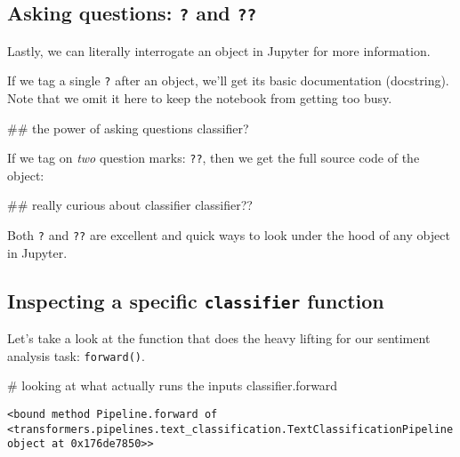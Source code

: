 \documentclass[
  letterpaper,
  DIV=11,
  numbers=noendperiod]{scrartcl}
\newenvironment{Shaded}{\begin{snugshade}}{\end{snugshade}}
\newcommand{\CommentTok}[1]{\textcolor[rgb]{0.37,0.37,0.37}{#1}}
\newcommand{\NormalTok}[1]{\textcolor[rgb]{0.00,0.23,0.31}{#1}}
\begin{document}
\subsection{\texorpdfstring{Asking questions: \texttt{?} and
\texttt{??}}{Asking questions: ? and ??}}\label{asking-questions-and}

Lastly, we can literally interrogate an object in Jupyter for more
information.

If we tag a single \texttt{?} after an object, we'll get its basic
documentation (docstring). Note that we omit it here to keep the
notebook from getting too busy.

\begin{Shaded}
\begin{Highlighting}[]
\CommentTok{\#\# the power of asking questions}
\NormalTok{classifier?}
\end{Highlighting}
\end{Shaded}

If we tag on \emph{two} question marks: \texttt{??}, then we get the
full source code of the object:

\begin{Shaded}
\begin{Highlighting}[]
\CommentTok{\#\# really curious about classifier}
\NormalTok{classifier??}
\end{Highlighting}
\end{Shaded}

Both \texttt{?} and \texttt{??} are excellent and quick ways to look
under the hood of any object in Jupyter.

\subsection{\texorpdfstring{Inspecting a specific \texttt{classifier}
function}{Inspecting a specific classifier function}}\label{inspecting-a-specific-classifier-function}

Let's take a look at the function that does the heavy lifting for our
sentiment analysis task: \texttt{forward()}.

\begin{Shaded}
\begin{Highlighting}[]
 \CommentTok{\# looking at what actually runs the inputs}
\NormalTok{classifier.forward}
\end{Highlighting}
\end{Shaded}

\begin{verbatim}
<bound method Pipeline.forward of <transformers.pipelines.text_classification.TextClassificationPipeline object at 0x176de7850>>
\end{verbatim}
\end{document}
